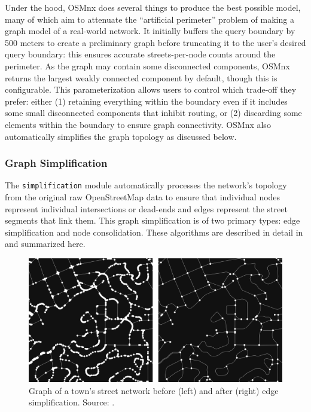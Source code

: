 \documentclass[12pt,letterpaper]{article} %
\begin{document}
Under the hood, OSMnx does several things to produce the best possible model, many of which aim to attenuate the \enquote{artificial perimeter} problem of making a graph model of a real-world network. It initially buffers the query boundary by 500 meters to create a preliminary graph before truncating it to the user's desired query boundary: this ensures accurate streets-per-node counts around the perimeter. As the graph may contain some disconnected components, OSMnx returns the largest weakly connected component by default, though this is configurable. This parameterization allows users to control which trade-off they prefer: either (1) retaining everything within the boundary even if it includes some small disconnected components that inhibit routing, or (2) discarding some elements within the boundary to ensure graph connectivity. OSMnx also automatically simplifies the graph topology as discussed below.

\subsubsection{Graph Simplification}

The \texttt{simplification} module automatically processes the network's topology from the original raw OpenStreetMap data to ensure that individual nodes represent individual intersections or dead-ends and edges represent the street segments that link them. This graph simplification is of two primary types: edge simplification and node consolidation. These algorithms are described in detail in \citet{boeing_graph_2025} and summarized here.

\begin{figure}[tbp]
    \centering
    \includegraphics[width=1\textwidth]{fig_graph_simplification.png}
    \caption{Graph of a town's street network before (left) and after (right) edge simplification. Source: \citet{boeing_graph_2025}.}\label{fig:graph_simplification}
\end{figure}
\end{document}
